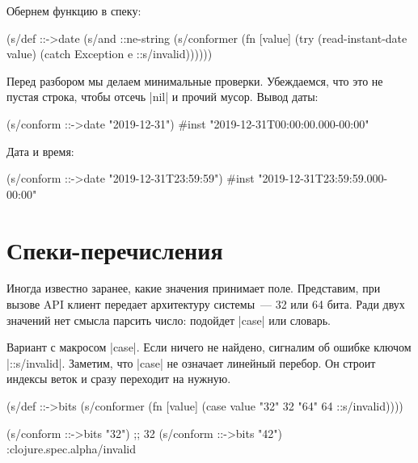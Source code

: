 \noindent
Обернем функцию в спеку:

\begin{english}
  \begin{clojure}
(s/def ::->date
  (s/and
   ::ne-string
   (s/conformer
    (fn [value]
      (try
        (read-instant-date value)
        (catch Exception e
          ::s/invalid))))))
  \end{clojure}
\end{english}

Перед разбором мы делаем минимальные проверки. Убеждаемся, что это не пустая
строка, чтобы отсечь \spverb|nil| и прочий мусор. Вывод даты:

\begin{english}
  \begin{clojure}
(s/conform ::->date "2019-12-31")
#inst "2019-12-31T00:00:00.000-00:00"
  \end{clojure}
\end{english}

\noindent
Дата и время:

\begin{english}
  \begin{clojure}
(s/conform ::->date "2019-12-31T23:59:59")
#inst "2019-12-31T23:59:59.000-00:00"
  \end{clojure}
\end{english}

\section{Спеки-перечисления}


Иногда известно заранее, какие значения принимает поле. Представим, при вызове
API клиент передает архитектуру системы~--- 32 или 64 бита. Ради двух значений
нет смысла парсить число: подойдет \spverb|case| или словарь.

Вариант с макросом \spverb|case|. Если ничего не найдено, сигналим об ошибке
ключом \spverb|::s/invalid|. Заметим, что \spverb|case| не означает линейный
перебор. Он строит индексы веток и сразу переходит на нужную.


\begin{english}
  \begin{clojure}
(s/def ::->bits
  (s/conformer
   (fn [value]
     (case value
       "32" 32
       "64" 64
       ::s/invalid))))

(s/conform ::->bits "32") ;; 32
(s/conform ::->bits "42") :clojure.spec.alpha/invalid
  \end{clojure}
\end{english}


